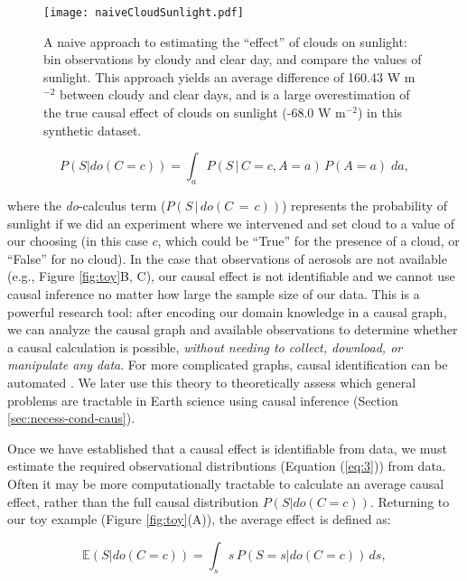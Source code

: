\documentclass[12pt]{article}
\begin{document}
\begin{figure}
  \texttt{[image: naiveCloudSunlight.pdf]}
  \caption{A naive approach to estimating the ``effect'' of clouds on
    sunlight: bin observations by cloudy and clear day, and compare
    the values of sunlight. This approach yields an average difference
    of 160.43 W m$^{-2}$ between cloudy and clear days, and is a large
    overestimation of the true causal effect of clouds on sunlight
    (-68.0 W m$^{-2}$) in this synthetic dataset.}
  \label{fig:naive-cloud-sunlight}
\end{figure}

\begin{equation}
  P(S | do(C = c)) = \int_{a} P(S \, | \, C = c,
  A=a) \, P(A=a) \; da,
  \label{eq:3}
\end{equation}

where the \textit{do}-calculus \citep{pearl2009} term
($P(S \, | \, do(C\, = \,c))$) represents the probability of sunlight
if we did an experiment where we intervened and set cloud to a value
of our choosing (in this case $c$, which could be ``True'' for the
presence of a cloud, or ``False'' for no cloud). In the case that
observations of aerosols are not available (e.g., Figure
\ref{fig:toy}B, C), our causal effect is not identifiable and we
cannot use causal inference no matter how large the sample size of our
data. This is a powerful research tool: after encoding our domain
knowledge in a causal graph, we can analyze the causal graph and
available observations to determine whether a causal calculation is
possible, \textit{without needing to collect, download, or manipulate
  any data}. For more complicated graphs, causal identification can be
automated \citep{shpitser2006}. We later use this theory to
theoretically assess which general problems are tractable in Earth
science using causal inference (Section \ref{sec:necess-cond-caus}).

Once we have established that a causal effect is identifiable from
data, we must estimate the required observational distributions
(Equation (\ref{eq:3})) from data. Often it may be more computationally
tractable to calculate an average causal effect, rather than the full
causal distribution $P(S | do(C=c))$. Returning to our toy example
(Figure \ref{fig:toy}(A)), the average effect is defined as:

\begin{equation}
  \mathbb{E}(S | do(C = c)) = \int_{s} s \, P(S = s
  | do(C=c)) \, ds,
  \label{eq:4}
\end{equation}
\end{document}
